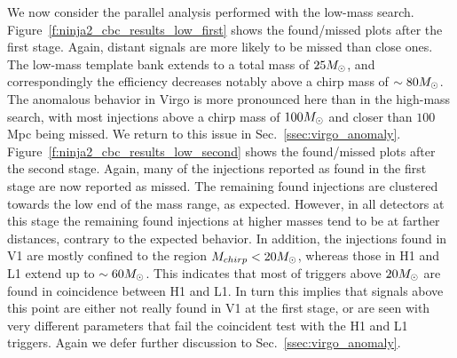 We now consider the parallel analysis performed with the low-mass
search.  Figure~\ref{f:ninja2_cbc_results_low_first} shows the
found/missed plots after the first stage.  Again, distant signals are
more likely to be missed than close ones.  The low-mass template bank
extends to a total mass of $25M_\odot$, and correspondingly the
efficiency decreases notably above a chirp mass of $\sim 80 M_\odot$.
The anomalous behavior in Virgo is more pronounced here than in the
high-mass search, with most injections above a chirp mass of $100
M_\odot$ and closer than $100$ Mpc being missed.  We return to this
issue in Sec.~\ref{ssec:virgo_anomaly}.
Figure~\ref{f:ninja2_cbc_results_low_second} shows the found/missed
plots after the second stage.  Again, many of the injections reported
as found in the first stage are now reported as missed.  The remaining
found injections are clustered towards the low end of the mass range,
as expected.  However, in all detectors at this stage the remaining found
injections at higher masses tend to be at farther distances, contrary
to the expected behavior.  In addition, the injections found in V1 are
mostly confined to the region $M_{chirp} < 20 M_\odot$, whereas those in
H1 and L1 extend up to $\sim 60 M_\odot$.  This indicates that most
of triggers above $20 M_\odot$ are found in coincidence between H1 and
L1.  In turn this implies that signals above this point are either not
really found in V1 at the first stage, or are seen with very different
parameters that fail the coincident test with the H1 and L1 triggers.
Again we defer further discussion to Sec.~\ref{ssec:virgo_anomaly}.


